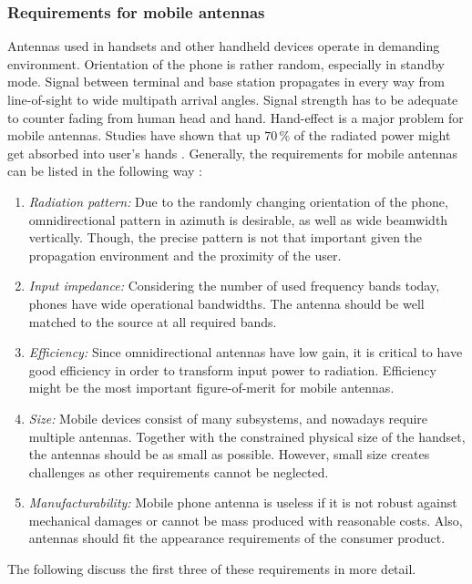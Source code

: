 \subsubsection{Requirements for mobile antennas}
\label{sec:requirements}
Antennas used in handsets and other handheld devices operate in demanding environment. Orientation of the phone is rather random, especially in standby mode. Signal between terminal and base station propagates in every way from line-of-sight to wide multipath arrival angles. Signal strength has to be adequate to counter fading from human head and hand. Hand-effect is a major problem for mobile antennas. Studies have shown that up $70\,\%$ of the radiated power might get absorbed into user's hands \cite{valkonen_phd}. Generally, the requirements for mobile antennas can be listed in the following way \cite{saunders, lehtovuori_phd}:
\begin{enumerate}
    \item \textit{Radiation pattern:} Due to the randomly changing orientation of the phone, omnidirectional pattern in azimuth is desirable, as well as wide beamwidth vertically. Though, the precise pattern is not that important given the propagation environment and the proximity of the user.
    \item \textit{Input impedance:} Considering the number of used frequency bands today, phones have wide operational bandwidths. The antenna should be well matched to the source at all required bands.
    \item \textit{Efficiency:} Since omnidirectional antennas have low gain, it is critical to have good efficiency in order to transform input power to radiation. Efficiency might be the most important figure-of-merit for mobile antennas.
    \item \textit{Size:} Mobile devices consist of many subsystems, and nowadays require multiple antennas. Together with the constrained physical size of the handset, the antennas should be as small as possible. However, small size creates challenges as other requirements cannot be neglected.
    \item \textit{Manufacturability:} Mobile phone antenna is useless if it is not robust against mechanical damages or cannot be mass produced with reasonable costs. Also, antennas should fit the appearance requirements of the consumer product. 
\end{enumerate}

The following  discuss the first three of these requirements in more detail.

